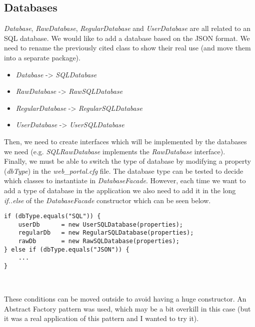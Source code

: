 \subsection{Databases}

\emph{Database}, \emph{RawDatabase}, \emph{RegularDatabase} and
\emph{UserDatabase} are all related to an SQL database. We would like to
add a database based on the JSON format. We need to rename the
previously cited class to show their real use (and move them into a
separate package).

\begin{itemize}
    \item \emph{Database} -> \emph{SQLDatabase}
    \item \emph{RawDatabase} -> \emph{RawSQLDatabase}
    \item \emph{RegularDatabase} -> \emph{RegularSQLDatabase}
    \item \emph{UserDatabase} -> \emph{UserSQLDatabase}
\end{itemize}

Then, we need to create interfaces which will be implemented by the databases we
need (e.g. \emph{SQLRawDatabase} implements the \emph{RawDatabase} interface).\\

Finally, we must be able to switch the type of database by modifying a property
(\emph{dbType}) in the \emph{web\_portal.cfg} file.
The database type can be tested to decide which classes to instantiate in
\emph{DatabaseFacade}. However, each time we want to add a type of
database in the application we also need to add it in the long \emph{if..else}
of the \emph{DatabaseFacade} constructor which can be seen below.\\

\begin{lstlisting}
if (dbType.equals("SQL")) {
	userDb		= new UserSQLDatabase(properties);
	regularDb	= new RegularSQLDatabase(properties);
	rawDb		= new RawSQLDatabase(properties);
} else if (dbType.equals("JSON")) {
    ...
}
\end{lstlisting}
\

These conditions can be moved outside to avoid having a huge constructor.
An Abstract Factory pattern was used, which may be a bit overkill in this case
(but it was a real application of this pattern and I wanted to try it).\\

